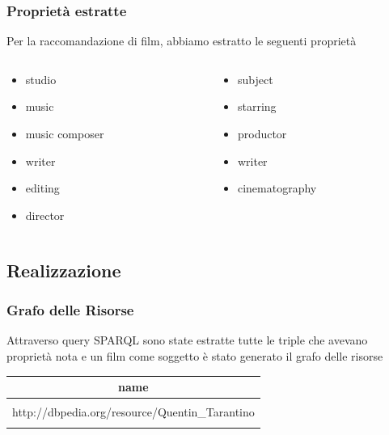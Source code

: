 \documentclass{beamer}
\begin{document}
\begin{frame}
\frametitle{Proprietà estratte}
Per la raccomandazione di film, abbiamo estratto le seguenti proprietà
\begin{columns}
\begin{column}{0.5\textwidth}
\begin{itemize}
\item studio
\item music
\item music composer
\item writer
\item editing
\item director
\end{itemize}
\end{column}
\begin{column}{0.5\textwidth}
\begin{itemize}
\item subject
\item starring
\item productor
\item writer
\item cinematography
\end{itemize}
\end{column}
\end{columns}
\end{frame}


\subsection{Realizzazione}


\begin{frame}
\frametitle{Grafo delle Risorse}
Attraverso query SPARQL sono state estratte tutte le triple che avevano proprietà nota e un film come soggetto
è stato generato il grafo delle risorse


\begin{table}
\begin{tabular}{|c|}
  \hline
  name \\
  \hline
  \\
  http://dbpedia.org/resource/Quentin\_Tarantino \\
  \\
  \hline
\end{tabular}
\end{table}

\end{frame}
\end{document}
